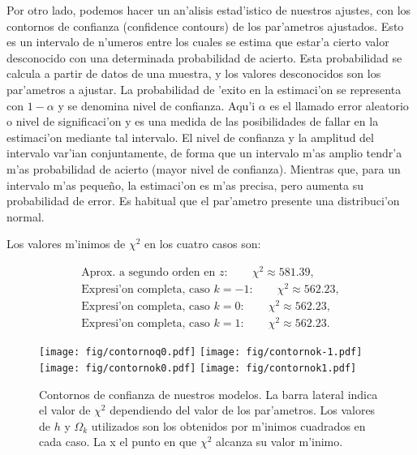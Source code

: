 Por otro lado, podemos hacer un an'alisis estad'istico de nuestros ajustes, con los contornos de confianza (confidence contours) de los
par'ametros ajustados. Esto es un intervalo de n'umeros entre los cuales se estima que estar'a cierto valor
desconocido con una determinada probabilidad de acierto. Esta probabilidad se calcula a partir de datos de una muestra, y los valores desconocidos
son los par'ametros a ajustar. La probabilidad de 'exito en la estimaci'on se representa con $1-\alpha$ y se denomina nivel de confianza. Aqu'i $\alpha$ 
es el llamado error aleatorio o nivel de significaci'on y es una medida de las posibilidades de fallar en la estimaci'on mediante tal intervalo.
El nivel de confianza y la amplitud del intervalo var'ian conjuntamente, de forma que un intervalo m'as amplio tendr'a m'as probabilidad
de acierto (mayor nivel de confianza). Mientras que, para un intervalo m'as peque\~no, la estimaci'on es m'as precisa, pero aumenta su
probabilidad de error. Es habitual que el par'ametro presente una distribuci'on normal.

Los valores m'inimos de $\chi^2$ en los cuatro casos son:


\begin{eqnarray}
\mbox{Aprox. a segundo orden en $z$}: \qquad \chi^2\approx581.39,\\
\mbox{Expresi'on completa, caso $k=-1$}: \qquad \chi^2\approx 562.23,\\
\mbox{Expresi'on completa, caso $k=0$}:  \qquad \chi^2\approx 562.23,\\
\mbox{Expresi'on completa, caso $k=1$}:  \qquad \chi^2\approx 562.23.
\end{eqnarray}
\begin{figure}[h]
  \centering
\texttt{[image: fig/contornoq0.pdf]}
\texttt{[image: fig/contornok-1.pdf]}
\texttt{[image: fig/contornok0.pdf]}
\texttt{[image: fig/contornok1.pdf]}
 \caption{Contornos de confianza de nuestros modelos. La barra lateral indica el valor de $\chi^2$ dependiendo del valor de los par'ametros. Los
 valores de $h$ y $\Omega_k$ utilizados son los obtenidos por m'inimos cuadrados en cada caso. La x el punto en que $\chi^2$ alcanza su valor m'inimo.}
  \label{parametros22}
\end{figure}

